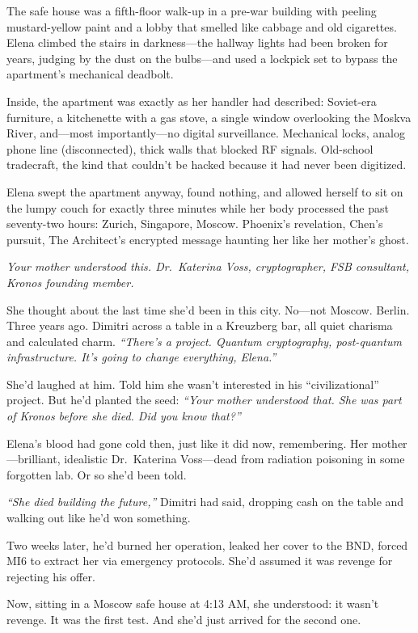 The safe house was a fifth-floor walk-up in a pre-war building with peeling mustard-yellow paint and a lobby that smelled like cabbage and old cigarettes. Elena climbed the stairs in darkness---the hallway lights had been broken for years, judging by the dust on the bulbs---and used a lockpick set to bypass the apartment's mechanical deadbolt.

Inside, the apartment was exactly as her handler had described: Soviet-era furniture, a kitchenette with a gas stove, a single window overlooking the Moskva River, and---most importantly---no digital surveillance. Mechanical locks, analog phone line (disconnected), thick walls that blocked RF signals. Old-school tradecraft, the kind that couldn't be hacked because it had never been digitized.

Elena swept the apartment anyway, found nothing, and allowed herself to sit on the lumpy couch for exactly three minutes while her body processed the past seventy-two hours: Zurich, Singapore, Moscow. Phoenix's revelation, Chen's pursuit, The Architect's encrypted message haunting her like her mother's ghost.

\emph{Your mother understood this. Dr.~Katerina Voss, cryptographer, FSB consultant, Kronos founding member.}

She thought about the last time she'd been in this city. No---not Moscow. Berlin. Three years ago. Dimitri across a table in a Kreuzberg bar, all quiet charisma and calculated charm. \emph{``There's a project. Quantum cryptography, post-quantum infrastructure. It's going to change everything, Elena.''}

She'd laughed at him. Told him she wasn't interested in his ``civilizational'' project. But he'd planted the seed: \emph{``Your mother understood that. She was part of Kronos before she died. Did you know that?''}

Elena's blood had gone cold then, just like it did now, remembering. Her mother---brilliant, idealistic Dr.~Katerina Voss---dead from radiation poisoning in some forgotten lab. Or so she'd been told.

\emph{``She died building the future,''} Dimitri had said, dropping cash on the table and walking out like he'd won something.

Two weeks later, he'd burned her operation, leaked her cover to the BND, forced MI6 to extract her via emergency protocols. She'd assumed it was revenge for rejecting his offer.

Now, sitting in a Moscow safe house at 4:13 AM, she understood: it wasn't revenge. It was the first test. And she'd just arrived for the second one.

